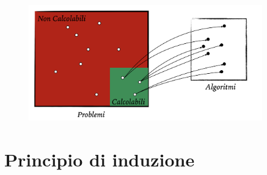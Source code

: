 \documentclass[a4paper]{article}
\begin{document}
\begin{figure}[H]
    \centering
    \includegraphics[width=0.9\textwidth]{fcalcolabili.png}
\end{figure}

\section{Principio di induzione}
\end{document}
